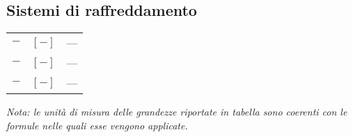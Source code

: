 \begin{multicols}{2}
	\subsection{Sistemi di raffreddamento}
	\begin{tabularx}{\linewidth}{ccX}
		$\bm{-}$ & $[-]$ & --- \\
		$\bm{-}$ & $[-]$ & --- \\
		$\bm{-}$ & $[-]$ & ---
	\end{tabularx}

\end{multicols}

\textit{Nota: le unità di misura delle grandezze riportate in tabella sono coerenti con le formule nelle quali esse vengono applicate.}